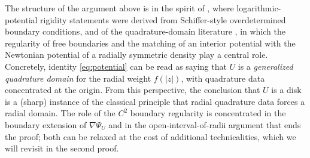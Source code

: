 \begin{remark}
The structure of the argument above is in the spirit of
\cite{Aharonov-Schiffer-Zalcman}, where logarithmic-potential
rigidity statements were derived from Schiffer-style overdetermined
boundary conditions, and of the quadrature-domain literature
\cite{Gustafsson,Gustafsson-Shahgholian,Shahgholian,Karp}, in which
the regularity of free boundaries and the matching of an interior
potential with the Newtonian potential of a radially symmetric
density play a central role. Concretely, identity
\eqref{eq:potential} can be read as saying that $U$ is a
\emph{generalized quadrature domain} for the radial weight $f(|z|)$,
with quadrature data concentrated at the origin. From this perspective,
the conclusion that $U$ is a disk is a (sharp) instance of the
classical principle that radial quadrature data forces a radial
domain. The role of the $C^2$ boundary regularity is concentrated
in the boundary extension of $\nabla\Psi_U$ and in the
open-interval-of-radii argument that ends the proof; both can be
relaxed at the cost of additional technicalities, which we will
revisit in the second proof.
\end{remark}

